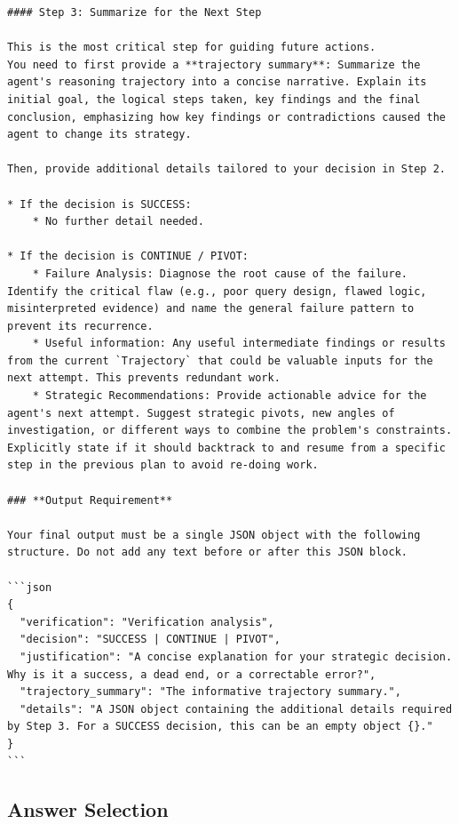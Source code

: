 \begin{center}
\begin{tcolorbox}[
  enhanced,
  breakable,                 %
  colback=white,
  colframe=black!50!white,
  title={Budget-aware Self-verification Module in BATS},
  width=1.0\linewidth        %
]
\begin{lstlisting}
#### Step 3: Summarize for the Next Step

This is the most critical step for guiding future actions. 
You need to first provide a **trajectory summary**: Summarize the agent's reasoning trajectory into a concise narrative. Explain its initial goal, the logical steps taken, key findings and the final conclusion, emphasizing how key findings or contradictions caused the agent to change its strategy.

Then, provide additional details tailored to your decision in Step 2.

* If the decision is SUCCESS:
    * No further detail needed.

* If the decision is CONTINUE / PIVOT:
    * Failure Analysis: Diagnose the root cause of the failure. Identify the critical flaw (e.g., poor query design, flawed logic, misinterpreted evidence) and name the general failure pattern to prevent its recurrence.
    * Useful information: Any useful intermediate findings or results from the current `Trajectory` that could be valuable inputs for the next attempt. This prevents redundant work.
    * Strategic Recommendations: Provide actionable advice for the agent's next attempt. Suggest strategic pivots, new angles of investigation, or different ways to combine the problem's constraints. Explicitly state if it should backtrack to and resume from a specific step in the previous plan to avoid re-doing work.

### **Output Requirement**

Your final output must be a single JSON object with the following structure. Do not add any text before or after this JSON block.

```json
{
  "verification": "Verification analysis",
  "decision": "SUCCESS | CONTINUE | PIVOT",
  "justification": "A concise explanation for your strategic decision. Why is it a success, a dead end, or a correctable error?",
  "trajectory_summary": "The informative trajectory summary.",
  "details": "A JSON object containing the additional details required by Step 3. For a SUCCESS decision, this can be an empty object {}."
}
```
\end{lstlisting}
\end{tcolorbox}
\captionsetup{justification=centering} %
\label{fig:prompt_verification}
\end{center}


\subsection{Answer Selection}\label{app:prompt_answer}

